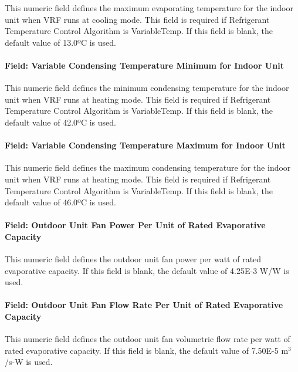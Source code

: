 This numeric field defines the maximum evaporating temperature for the indoor unit when VRF runs at cooling mode. This field is required if Refrigerant Temperature Control Algorithm is VariableTemp. If this field is blank, the default value of 13.0ºC is used.

\paragraph{Field: Variable Condensing Temperature Minimum for Indoor Unit}\label{field-variable-condensing-temperature-minimum-for-indoor-unit}

This numeric field defines the minimum condensing temperature for the indoor unit when VRF runs at heating mode. This field is required if Refrigerant Temperature Control Algorithm is VariableTemp. If this field is blank, the default value of 42.0ºC is used.

\paragraph{Field: Variable Condensing Temperature Maximum for Indoor Unit}\label{field-variable-condensing-temperature-maximum-for-indoor-unit}

This numeric field defines the maximum condensing temperature for the indoor unit when VRF runs at heating mode. This field is required if Refrigerant Temperature Control Algorithm is VariableTemp. If this field is blank, the default value of 46.0ºC is used.

\paragraph{Field: Outdoor Unit Fan Power Per Unit of Rated Evaporative Capacity}\label{field-outdoor-unit-fan-power-per-unit-of-rated-evaporative-capacity}

This numeric field defines the outdoor unit fan power per watt of rated evaporative capacity. If this field is blank, the default value of 4.25E-3 W/W is used.

\paragraph{Field: Outdoor Unit Fan Flow Rate Per Unit of Rated Evaporative Capacity}\label{field-outdoor-unit-fan-flow-rate-per-unit-of-rated-evaporative-capacity}

This numeric field defines the outdoor unit fan volumetric flow rate per watt of rated evaporative capacity. If this field is blank, the default value of 7.50E-5 m\(^{3}\)/s-W is used.

